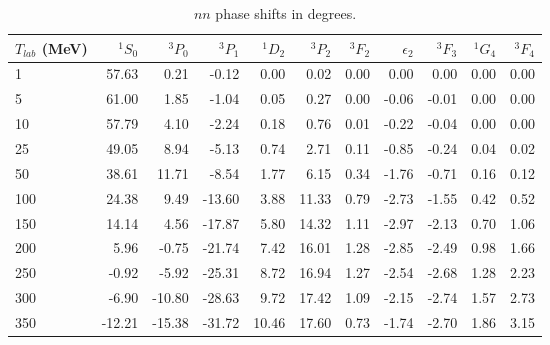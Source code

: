 \begin{table}
\caption{$nn$ phase shifts in degrees.}
\begin{tabular}{lrrrrrrrrrr}
 $T_{lab}$ (MeV)
 & $^1S_0$
 & $^3P_0$
 & $^3P_1$
 & $^1D_2$
 & $^3P_2$
 & $^3F_2$
 & $\epsilon_2$
 & $^3F_3$
 & $^1G_4$
 & $^3F_4$
\\
 \hline 
    1 &  57.63 &   0.21 &  -0.12 &   0.00 &   0.02 &   0.00 &   0.00 &   0.00 &   0.00 &   0.00 \\
    5 &  61.00 &   1.85 &  -1.04 &   0.05 &   0.27 &   0.00 &  -0.06 &  -0.01 &   0.00 &   0.00 \\
   10 &  57.79 &   4.10 &  -2.24 &   0.18 &   0.76 &   0.01 &  -0.22 &  -0.04 &   0.00 &   0.00 \\
   25 &  49.05 &   8.94 &  -5.13 &   0.74 &   2.71 &   0.11 &  -0.85 &  -0.24 &   0.04 &   0.02 \\
   50 &  38.61 &  11.71 &  -8.54 &   1.77 &   6.15 &   0.34 &  -1.76 &  -0.71 &   0.16 &   0.12 \\
  100 &  24.38 &   9.49 & -13.60 &   3.88 &  11.33 &   0.79 &  -2.73 &  -1.55 &   0.42 &   0.52 \\
  150 &  14.14 &   4.56 & -17.87 &   5.80 &  14.32 &   1.11 &  -2.97 &  -2.13 &   0.70 &   1.06 \\
  200 &   5.96 &  -0.75 & -21.74 &   7.42 &  16.01 &   1.28 &  -2.85 &  -2.49 &   0.98 &   1.66 \\
  250 &  -0.92 &  -5.92 & -25.31 &   8.72 &  16.94 &   1.27 &  -2.54 &  -2.68 &   1.28 &   2.23 \\
  300 &  -6.90 & -10.80 & -28.63 &   9.72 &  17.42 &   1.09 &  -2.15 &  -2.74 &   1.57 &   2.73 \\
  350 & -12.21 & -15.38 & -31.72 &  10.46 &  17.60 &   0.73 &  -1.74 &  -2.70 &   1.86 &   3.15 \\
\end{tabular}
\label{tab_phnn}
\end{table}

\pagebreak



